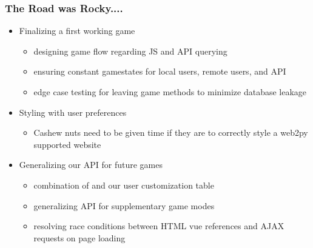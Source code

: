 \documentclass[t]{beamer}
\begin{document}
    \begin{frame}
        \frametitle{The Road was Rocky....}
        \begin{itemize}
            \item Finalizing a first working game
            \begin{itemize}
                \item designing game flow regarding JS and API querying
                \item ensuring constant gamestates for local users, remote users, and API
                \item edge case testing for leaving game methods to minimize database leakage
            \end{itemize}
            \item Styling with user preferences
            \begin{itemize}
                \item Cashew nuts need to be given time if they are to correctly style a web2py supported website
            \end{itemize}
            \item Generalizing our API for future games
            \begin{itemize}
                \item combination of  and our user customization table
                \item generalizing API for supplementary game modes
                \item resolving race conditions between HTML vue references and AJAX requests on page loading
            \end{itemize}
          \end{itemize}
    \end{frame}
\end{document}
